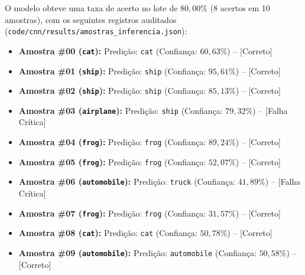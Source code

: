 \documentclass[runningheads]{llncs}
\begin{document}
O modelo obteve uma taxa de acerto no lote de \textbf{$80{,}00\%$} (8 acertos em 10 amostras), com os seguintes registros auditados (\texttt{code/cnn/results/amostras\_inferencia.json}):
\begin{itemize}
    \item \textbf{Amostra \#00 (\texttt{cat}):} Predi\c{c}\~{a}o: \texttt{cat} (Confian\c{c}a: $60{,}63\%$) -- [Correto]
    \item \textbf{Amostra \#01 (\texttt{ship}):} Predi\c{c}\~{a}o: \texttt{ship} (Confian\c{c}a: $95{,}61\%$) -- [Correto]
    \item \textbf{Amostra \#02 (\texttt{ship}):} Predi\c{c}\~{a}o: \texttt{ship} (Confian\c{c}a: $85{,}13\%$) -- [Correto]
    \item \textbf{Amostra \#03 (\texttt{airplane}):} Predi\c{c}\~{a}o: \texttt{ship} (Confian\c{c}a: $79{,}32\%$) -- [Falha Cr\'{i}tica]
    \item \textbf{Amostra \#04 (\texttt{frog}):} Predi\c{c}\~{a}o: \texttt{frog} (Confian\c{c}a: $89{,}24\%$) -- [Correto]
    \item \textbf{Amostra \#05 (\texttt{frog}):} Predi\c{c}\~{a}o: \texttt{frog} (Confian\c{c}a: $52{,}07\%$) -- [Correto]
    \item \textbf{Amostra \#06 (\texttt{automobile}):} Predi\c{c}\~{a}o: \texttt{truck} (Confian\c{c}a: $41{,}89\%$) -- [Falha Cr\'{i}tica]
    \item \textbf{Amostra \#07 (\texttt{frog}):} Predi\c{c}\~{a}o: \texttt{frog} (Confian\c{c}a: $31{,}57\%$) -- [Correto]
    \item \textbf{Amostra \#08 (\texttt{cat}):} Predi\c{c}\~{a}o: \texttt{cat} (Confian\c{c}a: $50{,}78\%$) -- [Correto]
    \item \textbf{Amostra \#09 (\texttt{automobile}):} Predi\c{c}\~{a}o: \texttt{automobile} (Confian\c{c}a: $50{,}58\%$) -- [Correto]
\end{itemize}
\end{document}
